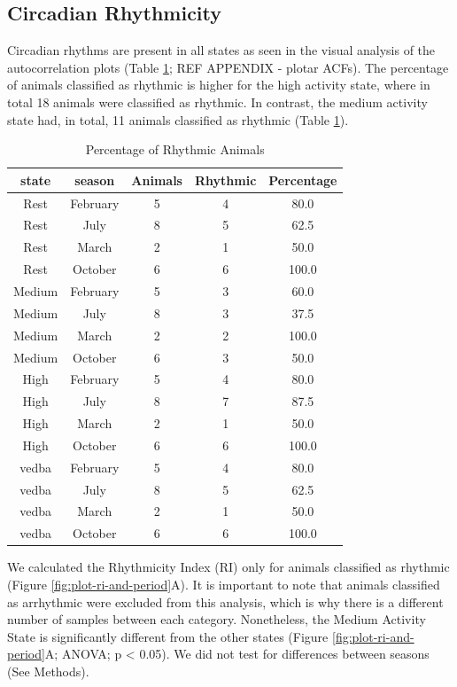 \documentclass[english,msc,numbers,hidelinks]{coppe}
\begin{document}
  \hypertarget{circadian-rhythmicity}{%
  \subsection{Circadian Rhythmicity}\label{circadian-rhythmicity}}

  Circadian rhythms are present in all states as seen in the visual analysis of the autocorrelation plots (Table \ref{tab:rhymicity-table}; REF APPENDIX - plotar ACFs). The percentage of animals classified as rhythmic is higher for the high activity state, where in total 18 animals were classified as rhythmic. In contrast, the medium activity state had, in total, 11 animals classified as rhythmic (Table \ref{tab:rhymicity-table}).
  \begin{table}[!h]

  \caption{\label{tab:rhymicity-table}Percentage of Rhythmic Animals}
  \centering
  \begin{tabular}[t]{ccccc}
  \toprule
  state & season & Animals & Rhythmic & Percentage\\
  \midrule
  Rest & February & 5 & 4 & 80.0\\
  Rest & July & 8 & 5 & 62.5\\
  Rest & March & 2 & 1 & 50.0\\
  Rest & October & 6 & 6 & 100.0\\
  Medium & February & 5 & 3 & 60.0\\
  \addlinespace
  Medium & July & 8 & 3 & 37.5\\
  Medium & March & 2 & 2 & 100.0\\
  Medium & October & 6 & 3 & 50.0\\
  High & February & 5 & 4 & 80.0\\
  High & July & 8 & 7 & 87.5\\
  \addlinespace
  High & March & 2 & 1 & 50.0\\
  High & October & 6 & 6 & 100.0\\
  vedba & February & 5 & 4 & 80.0\\
  vedba & July & 8 & 5 & 62.5\\
  vedba & March & 2 & 1 & 50.0\\
  \addlinespace
  vedba & October & 6 & 6 & 100.0\\
  \bottomrule
  \end{tabular}
  \end{table}
  We calculated the Rhythmicity Index (RI) only for animals classified as rhythmic (Figure \ref{fig:plot-ri-and-period}A). It is important to note that animals classified as arrhythmic were excluded from this analysis, which is why there is a different number of samples between each category. Nonetheless, the Medium Activity State is significantly different from the other states (Figure \ref{fig:plot-ri-and-period}A; ANOVA; p \textless{} 0.05). We did not test for differences between seasons (See Methods).
\end{document}
